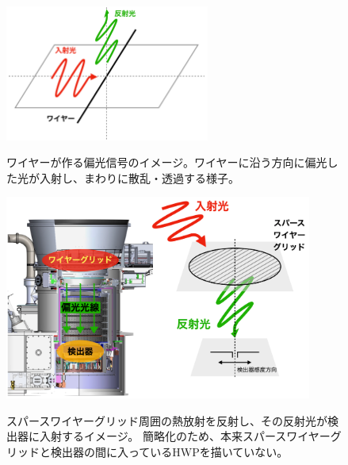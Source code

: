 \documentclass[../../main.tex]{subfiles}
\begin{document}
\begin{figure}[H]
    \centering
    \includegraphics[width=0.6\textwidth]{wiregrid/wire_reflect.pdf}
    \label{fig:wire_reflect}
    \caption{ワイヤーが作る偏光信号のイメージ。ワイヤーに沿う方向に偏光した光が入射し、まわりに散乱・透過する様子。}
\end{figure}
\begin{figure}[H]
    \centering
    \includegraphics[width=0.9\textwidth]{wiregrid/wiregrid_into_telescope.pdf}
    \label{fig:wire_grid_into_telescope}
    \caption{スパースワイヤーグリッド周囲の熱放射を反射し、その反射光が検出器に入射するイメージ。
    簡略化のため、本来スパースワイヤーグリッドと検出器の間に入っているHWPを描いていない。
    }
\end{figure}
\end{document}
